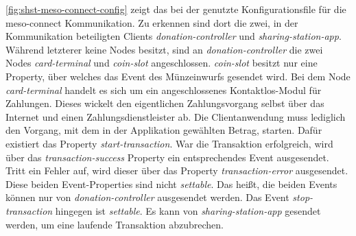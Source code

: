 \autoref{fig:shst-meso-connect-config} zeigt das bei der \shst{} genutzte Konfigurationsfile für die 
meso-connect Kommunikation. Zu erkennen sind dort die zwei, in der Kommunikation beteiligten Clients
\emph{donation-controller} und \emph{sharing-station-app}. Während letzterer keine Nodes
besitzt, sind an \emph{donation-controller} die zwei Nodes \emph{card-terminal} und 
\emph{coin-slot} angeschlossen. \emph{coin-slot} besitzt nur eine Property, über
welches das Event des Münzeinwurfs gesendet wird. Bei dem Node
\emph{card-terminal} handelt es sich um ein angeschlossenes Kontaktlos-Modul für Zahlungen. Dieses wickelt
den eigentlichen Zahlungsvorgang selbst über das Internet und einen Zahlungsdienstleister ab. 
Die Clientanwendung muss lediglich den Vorgang, mit dem in der Applikation gewählten Betrag,
starten. Dafür existiert das Property \emph{start-transaction}. War die Transaktion erfolgreich,
wird über das \emph{transaction-success} Property ein entsprechendes Event ausgesendet. Tritt ein 
Fehler auf, wird dieser über das Property \emph{transaction-error} ausgesendet. Diese beiden Event-Properties
sind nicht \emph{settable}. Das heißt, die beiden Events können nur von \emph{donation-controller} ausgesendet
werden. Das Event \emph{stop-transaction} hingegen ist \emph{settable}. 
Es kann von \emph{sharing-station-app} gesendet werden, um eine laufende Transaktion abzubrechen. 
